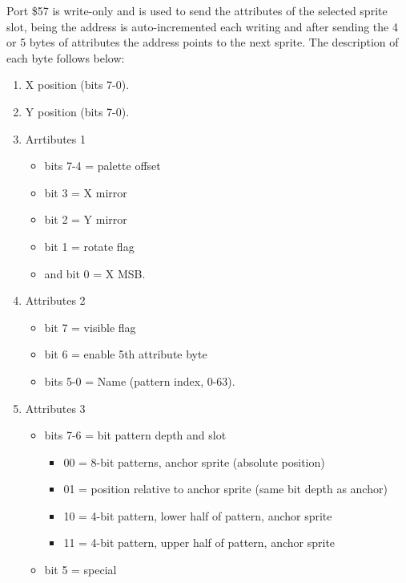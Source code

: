 Port \$57 is write-only and is used to send the attributes of the
selected sprite slot, being the address is auto-incremented each
writing and after sending the 4 or 5 bytes of attributes the address
points to the next sprite. The description of each byte follows below:
\begin{enumerate}
\item X position (bits 7-0).
\item Y position (bits 7-0).
\item Arrtibutes 1
  \begin{itemize}
  \item bits 7-4 = palette offset
  \item bit 3 = X mirror
  \item bit 2 = Y mirror
  \item bit 1 = rotate flag
  \item and bit 0 = X MSB.
  \end{itemize}
\item Attributes 2
  \begin{itemize}
  \item bit 7 = visible flag
  \item bit 6 = enable 5th attribute byte
  \item bits 5-0 = Name (pattern index, 0-63).
  \end{itemize}
\item Attributes 3
  \begin{itemize}
  \item bits 7-6 = bit pattern depth and slot
    \begin{itemize}
    \item 00 = 8-bit patterns,  anchor sprite (absolute position)
    \item 01 = position relative to anchor sprite (same bit depth as anchor)
    \item 10 = 4-bit pattern, lower half of pattern, anchor sprite
    \item 11 = 4-bit pattern, upper half of pattern, anchor sprite
    \end{itemize}
  \item bit 5 = special
  

\end{itemize}
\end{enumerate}
